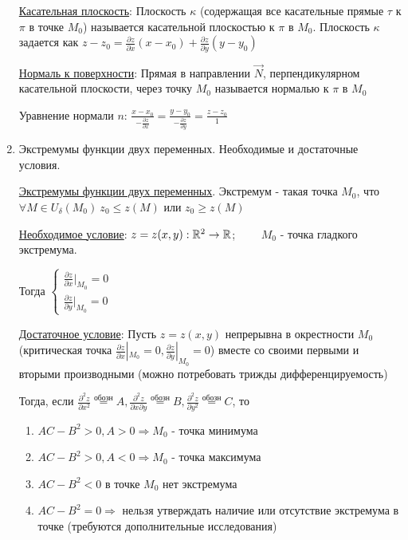\documentclass[12pt]{article}
\begin{document}
\begin{enumerate}
        \hyperlink{tangentplanetosurface}{Касательная плоскость}: Плоскость $\kappa$ (содержащая все касательные прямые $\tau$ к $\pi$ в точке $M_0$) называется касательной плоскостью к $\pi$ в $M_0$. Плоскость $\kappa$ задается как $z - z_0 = \frac{\partial z}{\partial x}(x - x_0) + \frac{\partial z}{\partial y} (y - y_0)$

        \hyperlink{normaltosurface}{Нормаль к поверхности}: Прямая в направлении $\overrightarrow{N}$, перпендикулярном касательной плоскости, через точку $M_0$ называется нормалью к $\pi$ в $M_0$

        Уравнение нормали $n$: $\frac{x - x_0}{-\frac{\partial z}{\partial x}} = \frac{y - y_0}{-\frac{\partial z}{\partial y}} = \frac{z - z_0}{1}$


        \item Экстремумы функции двух переменных. Необходимые и достаточные условия.

        \hyperlink{extremumsoffunctions}{Экстремумы функции двух переменных}.
        Экстремум - такая точка $M_0$, что $\forall M \in U_\delta(M_0) \ z_0 \leq z(M)$ или $z_0 \geq z(M)$

        \hyperlink{extremumnecessarycondition}{Необходимое условие}: $z = z(x, y) : \mathbb{R}^2 \rightarrow \mathbb{R}$; $\quad\quad M_0$ - точка гладкого экстремума.

        Тогда $\begin{cases}\frac{\partial z}{\partial x} |_{M_0} = 0 \\ \frac{\partial z}{\partial y} |_{M_0} = 0\end{cases}$

        \hyperlink{extremumsufficientcondition}{Достаточное условие}: Пусть $z = z(x, y)$ непрерывна в окрестности $M_0$ (критическая точка $\frac{\partial z}{\partial x} |_{M_0} = 0, \frac{\partial z}{\partial y} |_{M_0} = 0$)
        вместе со своими первыми и вторыми производными (можно потребовать трижды дифференцируемость)

        Тогда, если $\frac{\partial^2 z}{\partial x^2} \stackrel{\text{обозн}}{=} A, \frac{\partial^2 z}{\partial x \partial y} \stackrel{\text{обозн}}{=} B, \frac{\partial^2 z}{\partial y^2} \stackrel{\text{обозн}}{=} C$, то

        \begin{enumerate}
            \item $AC - B^2 > 0, A > 0 \Longrightarrow M_0$ - точка минимума
            \item $AC - B^2 > 0, A < 0 \Longrightarrow M_0$ - точка максимума
            \item $AC - B^2 < 0$ в точке $M_0$ нет экстремума
            \item $AC - B^2 = 0\Longrightarrow$ нельзя утверждать наличие или отсутствие экстремума в точке (требуются дополнительные исследования)
        \end{enumerate}

    \end{enumerate}
\end{document}
